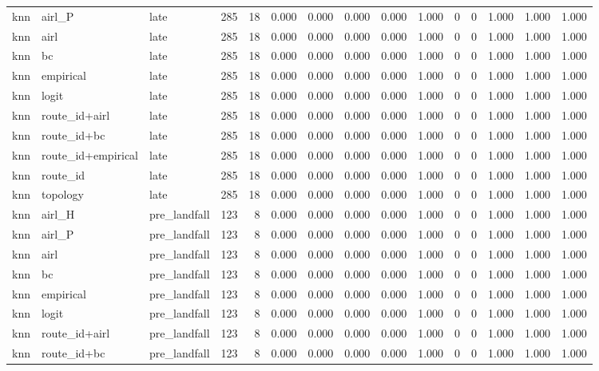 \begin{tabular}{lllrrrrrrrrrrrr}
knn & airl_P & late & 285 & 18 & 0.000 & 0.000 & 0.000 & 0.000 & 1.000 & 0 & 0 & 1.000 & 1.000 & 1.000 \\
knn & airl & late & 285 & 18 & 0.000 & 0.000 & 0.000 & 0.000 & 1.000 & 0 & 0 & 1.000 & 1.000 & 1.000 \\
knn & bc & late & 285 & 18 & 0.000 & 0.000 & 0.000 & 0.000 & 1.000 & 0 & 0 & 1.000 & 1.000 & 1.000 \\
knn & empirical & late & 285 & 18 & 0.000 & 0.000 & 0.000 & 0.000 & 1.000 & 0 & 0 & 1.000 & 1.000 & 1.000 \\
knn & logit & late & 285 & 18 & 0.000 & 0.000 & 0.000 & 0.000 & 1.000 & 0 & 0 & 1.000 & 1.000 & 1.000 \\
knn & route_id+airl & late & 285 & 18 & 0.000 & 0.000 & 0.000 & 0.000 & 1.000 & 0 & 0 & 1.000 & 1.000 & 1.000 \\
knn & route_id+bc & late & 285 & 18 & 0.000 & 0.000 & 0.000 & 0.000 & 1.000 & 0 & 0 & 1.000 & 1.000 & 1.000 \\
knn & route_id+empirical & late & 285 & 18 & 0.000 & 0.000 & 0.000 & 0.000 & 1.000 & 0 & 0 & 1.000 & 1.000 & 1.000 \\
knn & route_id & late & 285 & 18 & 0.000 & 0.000 & 0.000 & 0.000 & 1.000 & 0 & 0 & 1.000 & 1.000 & 1.000 \\
knn & topology & late & 285 & 18 & 0.000 & 0.000 & 0.000 & 0.000 & 1.000 & 0 & 0 & 1.000 & 1.000 & 1.000 \\
knn & airl_H & pre_landfall & 123 & 8 & 0.000 & 0.000 & 0.000 & 0.000 & 1.000 & 0 & 0 & 1.000 & 1.000 & 1.000 \\
knn & airl_P & pre_landfall & 123 & 8 & 0.000 & 0.000 & 0.000 & 0.000 & 1.000 & 0 & 0 & 1.000 & 1.000 & 1.000 \\
knn & airl & pre_landfall & 123 & 8 & 0.000 & 0.000 & 0.000 & 0.000 & 1.000 & 0 & 0 & 1.000 & 1.000 & 1.000 \\
knn & bc & pre_landfall & 123 & 8 & 0.000 & 0.000 & 0.000 & 0.000 & 1.000 & 0 & 0 & 1.000 & 1.000 & 1.000 \\
knn & empirical & pre_landfall & 123 & 8 & 0.000 & 0.000 & 0.000 & 0.000 & 1.000 & 0 & 0 & 1.000 & 1.000 & 1.000 \\
knn & logit & pre_landfall & 123 & 8 & 0.000 & 0.000 & 0.000 & 0.000 & 1.000 & 0 & 0 & 1.000 & 1.000 & 1.000 \\
knn & route_id+airl & pre_landfall & 123 & 8 & 0.000 & 0.000 & 0.000 & 0.000 & 1.000 & 0 & 0 & 1.000 & 1.000 & 1.000 \\
knn & route_id+bc & pre_landfall & 123 & 8 & 0.000 & 0.000 & 0.000 & 0.000 & 1.000 & 0 & 0 & 1.000 & 1.000 & 1.000 \\

\end{tabular}
